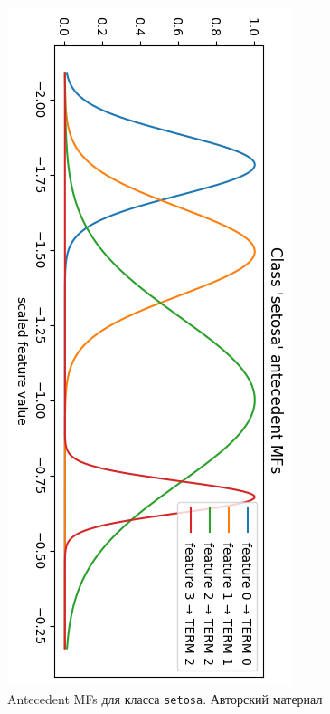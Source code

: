 \begin{figure}[H]
  \centering
  \includegraphics[width=0.9\linewidth]{images/mf_in_setosa.png}
  \caption{Antecedent MFs для класса \texttt{setosa}. Авторский материал}
  \label{fig:mf_in_setosa}
\end{figure}

